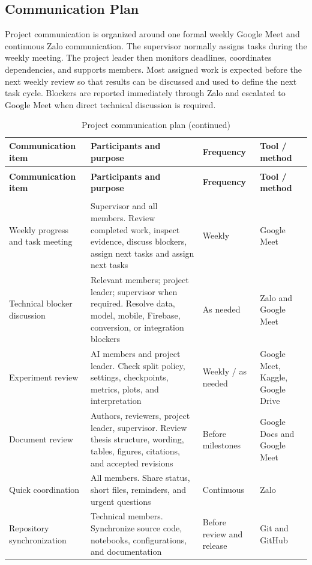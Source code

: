 \documentclass[12pt,a4paper]{report}
\begin{document}
\subsection{Communication Plan}
Project communication is organized around one formal weekly Google Meet and continuous Zalo communication. The supervisor normally assigns tasks during the weekly meeting. The project leader then monitors deadlines, coordinates dependencies, and supports members. Most assigned work is expected before the next weekly review so that results can be discussed and used to define the next task cycle. Blockers are reported immediately through Zalo and escalated to Google Meet when direct technical discussion is required.\par
\begingroup
\footnotesize
\setlength{\tabcolsep}{2pt}
\renewcommand{\arraystretch}{1.16}
\begin{longtable}{|>{\centering\arraybackslash}p{3.60cm}|>{\centering\arraybackslash}p{7.20cm}|>{\centering\arraybackslash}p{2.10cm}|>{\centering\arraybackslash}p{2.90cm}|}
\caption{Project communication plan}\\
\hline
\rowcolor{HeaderPeach}\textbf{Communication item} & \textbf{Participants and purpose} & \textbf{Frequency} & \textbf{Tool / method} \\ \hline
\endfirsthead
\caption[]{Project communication plan (continued)}\\
\hline
\rowcolor{HeaderPeach}\textbf{Communication item} & \textbf{Participants and purpose} & \textbf{Frequency} & \textbf{Tool / method} \\ \hline
\endhead
\hline
\multicolumn{4}{r}{\footnotesize Continued on next page}\\
\endfoot
\hline
\endlastfoot
Weekly progress and task meeting & Supervisor and all members. Review completed work, inspect evidence, discuss blockers, assign next tasks and assign next tasks & Weekly & Google Meet \\ \hline
Technical blocker discussion & Relevant members; project leader; supervisor when required. Resolve data, model, mobile, Firebase, conversion, or integration blockers & As needed & Zalo and Google Meet \\ \hline
Experiment review & AI members and project leader. Check split policy, settings, checkpoints, metrics, plots, and interpretation & Weekly / as needed & Google Meet, Kaggle, Google Drive \\ \hline
Document review & Authors, reviewers, project leader, supervisor. Review thesis structure, wording, tables, figures, citations, and accepted revisions & Before milestones & Google Docs and Google Meet \\ \hline
Quick coordination & All members. Share status, short files, reminders, and urgent questions & Continuous & Zalo \\ \hline
Repository synchronization & Technical members. Synchronize source code, notebooks, configurations, and documentation & Before review and release & Git and GitHub \\ \hline
\end{longtable}
\end{document}
